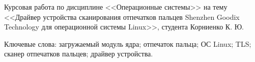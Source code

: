 \begin{essay}{}

Курсовая работа по дисциплине <<Операционные системы>> на тему <<Драйвер устройства сканирования отпечатков пальцев Shenzhen Goodix Technology для операционной системы Linux>>, студента Корниенко К. Ю.

Ключевые слова: загружаемый модуль ядра; отпечаток пальца; ОС Linux; TLS; сканер отпечатков пальцев; драйвер устройства. 


\end{essay}
